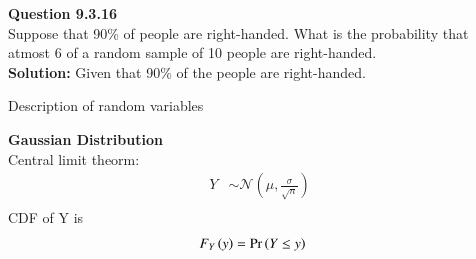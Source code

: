 \documentclass[journal,12pt,onecolumn]{IEEEtran}
\begin{document}
\newcommand{\solution}{\noindent \textbf{Solution: }}
\newcommand{\cosec}{\,\text{cosec}\,}
\providecommand{\dec}[2]{\ensuremath{\overset{#1}{\underset{#2}{\gtrless}}}}
\newcommand{\myvec}[1]{\ensuremath{\begin{pmatrix}#1\end{pmatrix}}}
\newcommand{\mydet}[1]{\ensuremath{\begin{vmatrix}#1\end{vmatrix}}}
\newcommand{\myaugvec}[2]{\ensuremath{\begin{amatrix}{#1}#2\end{amatrix}}}
\providecommand{\rank}{\text{rank}}
\providecommand{\pr}[1]{\ensuremath{\Pr\left(#1\right)}}
\providecommand{\qfunc}[1]{\ensuremath{Q\left(#1\right)}}
	\newcommand*{\permcomb}[4][0mu]{{{}^{#3}\mkern#1#2_{#4}}}
\newcommand*{\perm}[1][-3mu]{\permcomb[#1]{P}}
\newcommand*{\comb}[1][-1mu]{\permcomb[#1]{C}}
\providecommand{\qfunc}[1]{\ensuremath{Q\left(#1\right)}}
\providecommand{\gauss}[2]{\mathcal{N}\ensuremath{\left(#1,#2\right)}}
\providecommand{\diff}[2]{\ensuremath{\frac{d{#1}}{d{#2}}}}
\providecommand{\myceil}[1]{\left \lceil #1 \right \rceil }
\newcommand\figref{Fig.~\ref}
\newcommand\tabref{Table~\ref}
\newcommand{\sinc}{\,\text{sinc}\,}
\newcommand{\rect}{\,\text{rect}\,}
\let\vec\mathbf
\vspace{3cm}
\title{}
\author{EE22BTECH11029 - Komakula Sreeja}
\maketitle
\textbf{Question 9.3.16}\\ 
Suppose that 90\% of people are right-handed. What is the probability that atmost 6 of a random sample of 10 people are right-handed.\\
\solution
\fi
Given that 90\% of the people are right-handed.\\
\begin{table}[H]
        \caption{Description of random variables}
        \label{tab:ncert/9/3/16/}
        \centering
        
\end{table}
\textbf{Gaussian Distribution}\\
Central limit theorm:\\
\begin{align}
Y &\sim \gauss{\mu}{\frac{\sigma}{\sqrt{n}}}\\
\end{align}
CDF of Y is
\begin{align}
F_{Y}\brak{y} &= \pr{Y \leq y}
\end{align}
\end{document}
